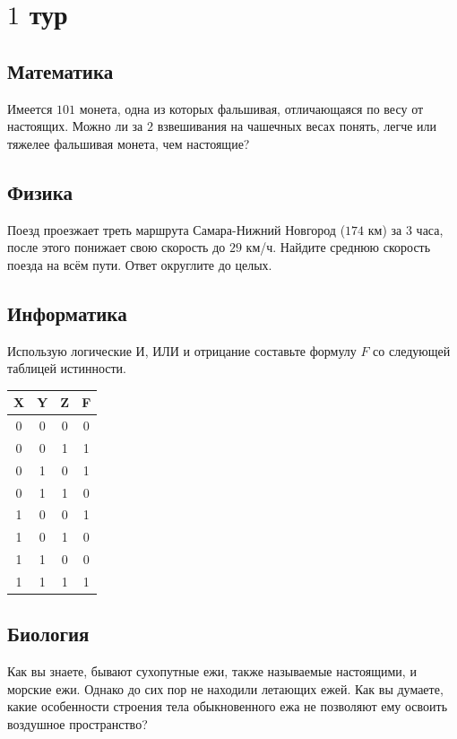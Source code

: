 \documentclass[a4paper, 12pt]{article}
\begin{document}
	\clearpage
	\pagestyle{empty}
	\section*{$1$ тур}
	\subsection*{Математика}
	Имеется $101$ монета, одна из которых фальшивая, отличающаяся по весу от настоящих. Можно ли за $2$ взвешивания на чашечных весах понять, легче или тяжелее фальшивая монета, чем настоящие?
	\subsection*{Физика}
	 Поезд проезжает треть маршрута Самара-Нижний Новгород ($174$ км) за $3$ часа, после этого понижает свою скорость до $29$ км/ч. Найдите среднюю скорость поезда на всём пути. Ответ округлите до целых.
	 \subsection*{Информатика}
	 Использую логические И, ИЛИ и отрицание составьте формулу $F$ со следующей таблицей истинности.
	 \begin{center}
	 		 \begin{tabular}{|c|c|c|c|}
	 		\hline
	 		X & Y & Z & F \\
	 		\hline
	 		0 & 0 & 0 & 0 \\
	 		\hline
	 		0 & 0 & 1 & 1 \\
	 		\hline
	 		0 & 1 & 0 & 1 \\
	 		\hline
	 		0 & 1 & 1 & 0 \\
	 		\hline
	 		1 & 0 & 0 & 1 \\
	 		\hline
	 		1 & 0 & 1 & 0 \\
	 		\hline
	 		1 & 1 & 0 & 0 \\
	 		\hline
	 		1 & 1 & 1 & 1 \\
	 		\hline
	 	\end{tabular}
	 \end{center}
	 \subsection*{Биология}
	 Как вы знаете, бывают сухопутные ежи, также называемые настоящими, и морские ежи. Однако до сих пор не находили летающих ежей. Как вы думаете, какие особенности строения тела обыкновенного ежа не позволяют ему освоить воздушное пространство?
\end{document}
